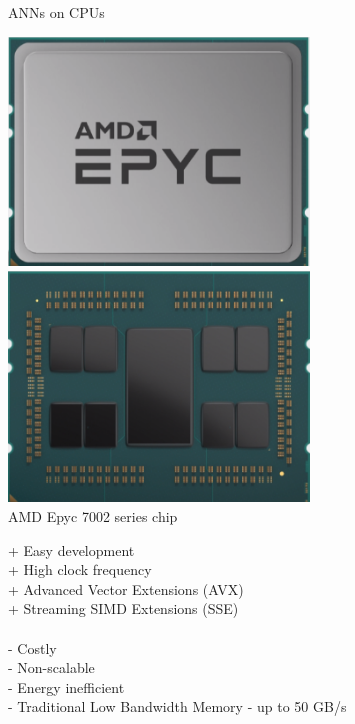 \begin{frame}{ANNs on CPUs}
	\begin{minipage}{0.4\textwidth}
		\centering
		\includegraphics[width=0.6\textwidth]{../Images/Hardware/amd-epyc.png}\\
		\includegraphics[width=0.6\textwidth]{../Images/Hardware/amd-epyc-dies.png}\\
		AMD Epyc 7002 series chip
	\end{minipage}%
	\begin{minipage}{0.6\textwidth}
		+ Easy development\\
		+ High clock frequency\\
		+ Advanced Vector Extensions (AVX)\\
		+ Streaming SIMD Extensions (SSE)\\\\
		- Costly\\
		- Non-scalable\\
		- Energy inefficient\\
		- Traditional Low Bandwidth Memory - up to 50 GB/s
	\end{minipage}
\end{frame}

